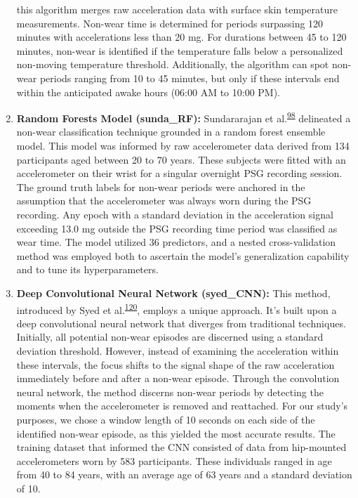 \documentclass[
  10pt,
]{scrbook}
\let\originaltextbf\textbf
\renewcommand{\textbf}[1]{\textcolor{color1}{\textsf{\originaltextbf{#1}}}}
\begin{document}
\begin{enumerate}
  this algorithm merges raw acceleration data with surface skin
  temperature measurements. Non-wear time is determined for periods
  surpassing 120 minutes with accelerations less than 20 mg. For
  durations between 45 to 120 minutes, non-wear is identified if the
  temperature falls below a personalized non-moving temperature
  threshold. Additionally, the algorithm can spot non-wear periods
  ranging from 10 to 45 minutes, but only if these intervals end within
  the anticipated awake hours (06:00 AM to 10:00 PM).
\item
  \textsf{\textbf{Random Forests Model (sunda\_RF):}} Sundararajan et
  al.\textsuperscript{\protect\hyperlink{ref-sundararajan_sleep_2021}{98}}
  delineated a non-wear classification technique grounded in a random
  forest ensemble model. This model was informed by raw accelerometer
  data derived from 134 participants aged between 20 to 70 years. These
  subjects were fitted with an accelerometer on their wrist for a
  singular overnight PSG recording session. The ground truth labels for
  non-wear periods were anchored in the assumption that the
  accelerometer was always worn during the PSG recording. Any epoch with
  a standard deviation in the acceleration signal exceeding 13.0 mg
  outside the PSG recording time period was classified as wear time. The
  model utilized 36 predictors, and a nested cross-validation method was
  employed both to ascertain the model's generalization capability and
  to tune its hyperparameters.
\item
  \textsf{\textbf{Deep Convolutional Neural Network (syed\_CNN):}} This
  method, introduced by Syed et
  al.\textsuperscript{\protect\hyperlink{ref-syed_novel_2021}{120}},
  employs a unique approach. It's built upon a deep convolutional neural
  network that diverges from traditional techniques. Initially, all
  potential non-wear episodes are discerned using a standard deviation
  threshold. However, instead of examining the acceleration within these
  intervals, the focus shifts to the signal shape of the raw
  acceleration immediately before and after a non-wear episode. Through
  the convolution neural network, the method discerns non-wear periods
  by detecting the moments when the accelerometer is removed and
  reattached. For our study's purposes, we chose a window length of 10
  seconds on each side of the identified non-wear episode, as this
  yielded the most accurate results. The training dataset that informed
  the CNN consisted of data from hip-mounted accelerometers worn by 583
  participants. These individuals ranged in age from 40 to 84 years,
  with an average age of 63 years and a standard deviation of 10.
\end{enumerate}
\end{document}
